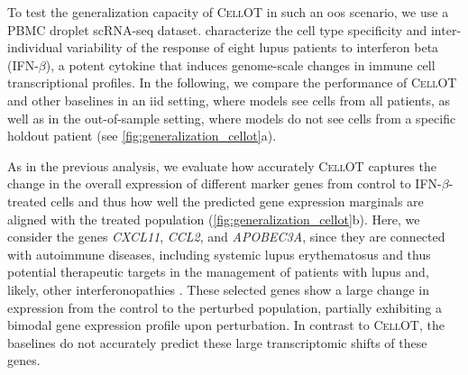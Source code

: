 To test the generalization capacity of \textsc{CellOT} in such an \acrfull{oos} scenario, we use a \acrfull{PBMC} droplet scRNA-seq dataset. \citet{kang2018multiplexed} characterize the cell type specificity and inter-individual variability of the response of eight lupus patients to interferon beta (IFN-$\beta$), a potent cytokine that induces genome-scale changes in immune cell transcriptional profiles. 
In the following, we compare the performance of \textsc{CellOT} and other baselines in an \acrfull{iid} setting, where models see cells from all patients, as well as in the out-of-sample setting, where models do not see cells from a specific holdout patient (see \cref{fig:generalization_cellot}a).
    
As in the previous analysis, we evaluate how accurately \textsc{CellOT} captures the change in the overall expression of different marker genes from control to IFN-$\beta$-treated cells and thus how well the predicted gene expression marginals are aligned with the treated population (\cref{fig:generalization_cellot}b). Here, we consider the genes \textit{CXCL11}, \textit{CCL2}, and \textit{APOBEC3A},
since they are connected with autoimmune diseases, including systemic lupus erythematosus \citep{hedrich2011epigenetic, perez2021sustained}
and thus potential therapeutic targets
in the management of patients with lupus and, likely, other interferonopathies \citep{mathian2015targeting,rani1996characterization,hedrich2011epigenetic,mathian2015targeting,perez2021sustained,flier2001differential}.
These selected genes show a large change in expression from the control to the perturbed population, partially exhibiting a bimodal gene expression profile upon perturbation. In contrast to \textsc{CellOT}, the baselines do not accurately predict these large transcriptomic shifts of these genes.



